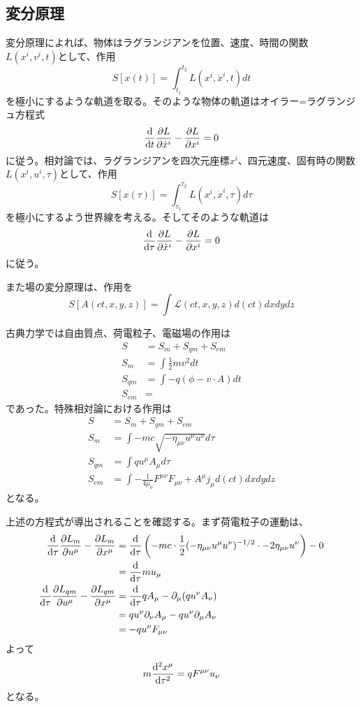\subsection{変分原理}
    変分原理によれば、物体はラグランジアンを位置、速度、時間の関数$L(x^i, v^i, t)$として、作用
        \[S[x(t)] = \int_{t_1}^{t_2} L(x^i, \dot{x}^i, t) dt\]
    を極小にするような軌道を取る。そのような物体の軌道はオイラー=ラグランジュ方程式
        \[\dv{t}\pdv{L}{\dot{x}^i} - \pdv{L}{x^i} = 0\]
    に従う。相対論では、ラグランジアンを四次元座標$x^i$、四元速度、固有時の関数$L(x^i, u^i, \tau)$として、作用
        \[S[x(\tau)] = \int_{\tau_1}^{\tau_2} L(x^i, \dot{x}^i, \tau) d\tau\]
    を極小にするよう世界線を考える。そしてそのような軌道は
        \[\dv{\tau}\pdv{L}{\dot{x}^i} - \pdv{L}{x^i} = 0\]
    に従う。

    また場の変分原理は、作用を
        \[S[A(ct, x, y, z)] = \int \mathcal{L}(ct, x, y, z) d(ct)dxdydz\]
    
    古典力学では自由質点、荷電粒子、電磁場の作用は
    \begin{align*}
        S &= S_m + S_{qm} + S_{em}\\
        S_m    &= \int \frac{1}{2}mv^2 dt\\
        S_{qm} &= \int -q(\phi - v \cdot A) dt\\
        S_{em} &= 
    \end{align*}
    であった。特殊相対論における作用は
    \begin{align*}
        S &= S_m + S_{qm} + S_{em}\\
        S_m    &= \int -mc\sqrt{-\eta_{\mu\nu} u^\mu u^\nu} d\tau\\
        S_{qm} &= \int q u^\mu A_\mu d\tau\\
        S_{em} &= \int -\frac{1}{4\mu_0}F^{\mu\nu}F_{\mu\nu} + A^\mu j_\mu d(ct)dxdydz
    \end{align*}
    となる。

    上述の方程式が導出されることを確認する。まず荷電粒子の運動は、
    \begin{align*}
        \dv{\tau}\pdv{L_m}{u^\mu} - \pdv{L_m}{x^\mu}
            &= \dv{\tau}\left(-mc \cdot \frac{1}{2}(-\eta_{\mu\nu} u^\mu u^\nu)^{-1/2} \cdot -2\eta_{\mu\nu}u^\nu\right) - 0\\
            &= \dv{\tau}mu_\mu\\
        \dv{\tau}\pdv{L_{qm}}{u^\mu} - \pdv{L_{qm}}{x^\mu}
            &= \dv{\tau} qA_\mu - \partial_\mu(q u^\nu A_\nu)\\
            &= q u^\nu \partial_\nu A_\mu - q u^\nu \partial_\mu A_\nu\\
            &= -q u^\nu F_{\mu\nu}
    \end{align*}
    よって
        \[m \dv[2]{x^\mu}{\tau} = qF^{\mu\nu}u_\nu\]
    となる。


